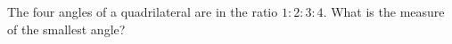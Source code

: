 The four angles of a quadrilateral are in the ratio $1:2:3:4$. What is the measure of the smallest angle?
